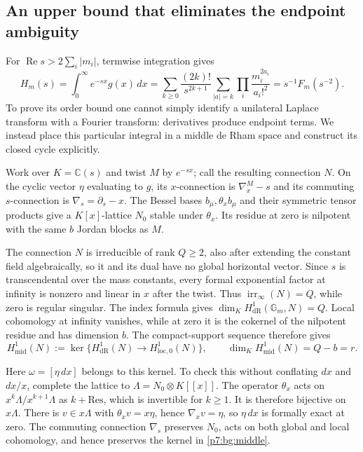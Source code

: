 \documentclass[11pt,a4paper]{article}
\theoremstyle{definition}
\theoremstyle{remark}
\numberwithin{equation}{section}
\begin{document}
\subsection{An upper bound that eliminates the endpoint ambiguity}

For $\operatorname{Re}s>2\sum_i|m_i|$, termwise integration gives
\begin{equation}\label{p7:bg:Laplace}
 H_m(s)=\int_0^\infty e^{-sx}g(x)\,dx
       =\sum_{k\ge0}\frac{(2k)!}{s^{2k+1}}
                   \sum_{|a|=k}\prod_i\frac{m_i^{2a_i}}{a_i!^2}
       =s^{-1}F_m(s^{-2}).
\end{equation}
To prove its order bound one cannot simply identify a unilateral
Laplace transform with a Fourier transform: derivatives produce
endpoint terms.  We instead place this particular integral in a
middle de Rham space and construct its closed cycle explicitly.

Work over $K=\mathbb C(s)$ and twist $M$ by $e^{-sx}$; call the
resulting connection $N$.  On the cyclic vector $\eta$ evaluating to
$g$, its $x$-connection is $\nabla_x^M-s$ and its commuting
$s$-connection is $\nabla_s=\partial_s-x$.  The Bessel bases
$b_\mu,\theta_xb_\mu$ and their symmetric tensor products give a
$K[x]$-lattice $N_0$ stable under $\theta_x$.  Its residue at zero
is nilpotent with the same $b$ Jordan blocks as $M$.

The connection $N$ is irreducible of rank $Q\ge2$, also after
extending the constant field algebraically, so it and its dual
have no global horizontal vector.  Since $s$ is transcendental
over the mass constants, every formal exponential factor at
infinity is nonzero and linear in $x$ after the twist.  Thus
$\operatorname{irr}_\infty(N)=Q$, while zero is regular singular.
The index formula gives $\dim_K H^1_{\mathrm{dR}}(\mathbb G_m,N)=Q$.
Local cohomology at infinity vanishes, while at zero it is the
cokernel of the nilpotent residue and has dimension $b$.
The compact-support sequence therefore gives
\begin{equation}\label{p7:bg:middle}
 H^1_{\mathrm{mid}}(N):=
 \ker\{H^1_{\mathrm{dR}}(N)\longrightarrow H^1_{\mathrm{loc},0}(N)\},
 \qquad \dim_K H^1_{\mathrm{mid}}(N)=Q-b=r.
\end{equation}

Here $\omega=[\eta\,dx]$ belongs to this kernel.  To check this
without conflating $dx$ and $dx/x$, complete the lattice to
$\Lambda=N_0\otimes K[[x]]$.  The operator $\theta_x$ acts on
$x^k\Lambda/x^{k+1}\Lambda$ as $k+\mathrm{Res}$, which is
invertible for $k\ge1$.  It is therefore bijective on $x\Lambda$.
There is $v\in x\Lambda$ with $\theta_xv=x\eta$, hence
$\nabla_xv=\eta$, so $\eta\,dx$ is formally exact at zero.
The commuting connection $\nabla_s$ preserves $N_0$, acts on
both global and local cohomology, and hence preserves the kernel
in \eqref{p7:bg:middle}.
\end{document}
